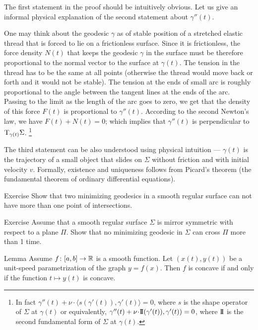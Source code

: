 The first statement in the proof should be intuitively obvious.
Let us give an informal physical explanation of the second statement about $\gamma''(t)$.

One may think about the geodesic $\gamma$ as of stable position of a stretched elastic thread that is forced to lie on a frictionless surface.
Since it is frictionless, the force density $N(t)$ that keeps the geodesic $\gamma$ in the surface must be therefore proportional to the normal vector to the surface at $\gamma(t)$.
The tension in the thread has to be the same at all points (otherwise the thread would move back or forth and it would not be stable).
The tension at the ends of small arc is roughly proportional to the angle between the tangent lines at the ends of the arc. 
Passing to the limit as the length of the arc goes to zero, we get that the density of this force $F(t)$ is proportional to $\gamma''(t)$.
According to the second Newton's law, we have $F(t)+N(t)=0$;
which implies that  $\gamma''(t)$ is perpendicular to $\mathrm{T}_{\gamma(t)}\Sigma$.%
\footnote{In fact $\gamma''(t)+\nu\cdot \langle s(\gamma'(t)),\gamma'(t)\rangle=0$, where $s$ is the shape operator of $\Sigma$ at $\gamma(t)$ or equivalently,
$\gamma''(t)+\nu\cdot  \II(\gamma'(t)),\gamma'(t))=0$, where $\mathrm{I}\!\mathrm{I}$ is the second fundamental form of $\Sigma$ at $\gamma(t)$.}

The third statement can be also understood using physical intuition --- $\gamma(t)$ is the trajectory of a small object that slides on $\Sigma$ without friction and with initial velocity $v$.
Formally, existence and uniqueness follows from Picard's theorem (the  fundamental theorem of ordinary differential equations).

\begin{thm}{Exercise}
Show that two minimizing geodesics in a smooth regular surface  can not have more than one point of intersections. 
\end{thm}

\begin{thm}{Exercise}
Assume that a smooth regular surface $\Sigma$ is mirror symmetric with respect to a plane $\Pi$.
Show that no minimizing geodesic in $\Sigma$ can cross $\Pi$ more than 1 time.
\end{thm}



\begin{thm}{Lemma}\label{lem:unit-speed} Assume $f\colon[a,b]\to\mathbb{R}$ is a smooth  function. 
Let $(x(t),y(t))$ be a unit-speed parametrization of the graph $y=f(x)$.
Then $f$ is concave if and only if the function $t\mapsto y(t)$ is concave.
\end{thm}

